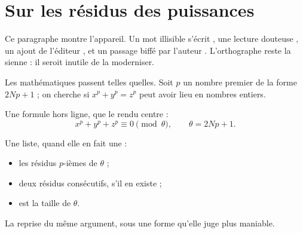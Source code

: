 \documentclass[11pt,a4paper]{article}
\begin{document}
\section{Sur les résidus des puissances}

Ce paragraphe montre l'appareil. Un mot illisible s'écrit \ill{}, une lecture
douteuse , un ajout de l'éditeur , et un passage
biffé par l'auteur . L'orthographe reste la sienne : il
seroit inutile de la moderniser.

Les mathématiques passent telles quelles. Soit $p$ un nombre premier de la
forme $2Np + 1$ ; on cherche si $x^p + y^p = z^p$ peut avoir lieu en nombres
entiers.

Une formule hors ligne, que le rendu centre :
\[
  x^p + y^p + z^p \equiv 0 \pmod{\theta},
  \qquad \theta = 2Np + 1 .
\]

Une liste, quand elle en fait une :
\begin{itemize}
  \item les résidus $p$-ièmes de $\theta$ ;
  \item deux résidus consécutifs, s'il en existe ;
  \item {} est la taille de $\theta$.
\end{itemize}


La reprise du même argument, sous une forme qu'elle juge plus maniable.
\end{document}
